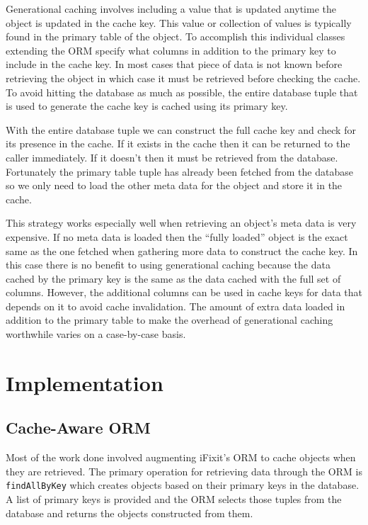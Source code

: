 \documentclass[12pt]{ucthesis}
\begin{document}
Generational caching involves including a value that is updated anytime the object is updated in the cache key.
This value or collection of values is typically found in the primary table of the object.
To accomplish this individual classes extending the ORM specify what columns in addition to the primary key to include in the cache key.
In most cases that piece of data is not known before retrieving the object in which case it must be retrieved before checking the cache.
To avoid hitting the database as much as possible, the entire database tuple that is used to generate the cache key is cached using its primary key.

With the entire database tuple we can construct the full cache key and check for its presence in the cache.
If it exists in the cache then it can be returned to the caller immediately.
If it doesn't then it must be retrieved from the database.
Fortunately the primary table tuple has already been fetched from the database so we only need to load the other meta data for the object and store it in the cache.

This strategy works especially well when retrieving an object's meta data is very expensive.
If no meta data is loaded then the ``fully loaded'' object is the exact same as the one fetched when gathering more data to construct the cache key.
In this case there is no benefit to using generational caching because the data cached by the primary key is the same as the data cached with the full set of columns.
However, the additional columns can be used in cache keys for data that depends on it to avoid cache invalidation.
The amount of extra data loaded in addition to the primary table to make the overhead of generational caching worthwhile varies on a case-by-case basis.

\section{Implementation}
\subsection{Cache-Aware ORM}
Most of the work done involved augmenting iFixit's ORM to cache objects when they are retrieved.
The primary operation for retrieving data through the ORM is {\tt findAllByKey} which creates objects based on their primary keys in the database.
A list of primary keys is provided and the ORM selects those tuples from the database and returns the objects constructed from them.
\end{document}
